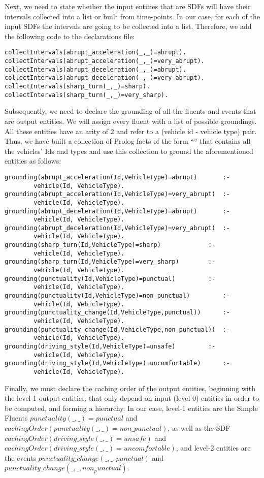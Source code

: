 Next, we need to state whether the input entities that are SDFs will have their intervals collected into a list or built from time-points. In our case, for each of the input SDFs the intervals are going to be collected into a list. Therefore, we add the following code to the declarations file:
%
\begin{verbatim}
collectIntervals(abrupt_acceleration(_,_)=abrupt).
collectIntervals(abrupt_acceleration(_,_)=very_abrupt).
collectIntervals(abrupt_deceleration(_,_)=abrupt).
collectIntervals(abrupt_deceleration(_,_)=very_abrupt).
collectIntervals(sharp_turn(_,_)=sharp).
collectIntervals(sharp_turn(_,_)=very_sharp).
\end{verbatim}
%
Subsequently, we need to declare the grounding of all the fluents and events that are output entities. We will assign every fluent with a list of possible groundings. All these entities have an arity of 2 and refer to a (vehicle id - vehicle type) pair. Thus, we have built a collection of Prolog facts of the form ``'' that contains all the vehicles' Ids and types and use this collection to ground the aforementioned entities as follows: 
%
\begin{verbatim}
grounding(abrupt_acceleration(Id,VehicleType)=abrupt) 		:-
        vehicle(Id, VehicleType). 
grounding(abrupt_acceleration(Id,VehicleType)=very_abrupt) 	:-
        vehicle(Id, VehicleType). 
grounding(abrupt_deceleration(Id,VehicleType)=abrupt) 		:-
        vehicle(Id, VehicleType). 
grounding(abrupt_deceleration(Id,VehicleType)=very_abrupt) 	:-
        vehicle(Id, VehicleType). 
grounding(sharp_turn(Id,VehicleType)=sharp) 			:-
        vehicle(Id, VehicleType). 
grounding(sharp_turn(Id,VehicleType)=very_sharp) 		:-
        vehicle(Id, VehicleType).
grounding(punctuality(Id,VehicleType)=punctual) 		:-
        vehicle(Id, VehicleType).   
grounding(punctuality(Id,VehicleType)=non_punctual) 		:-
        vehicle(Id, VehicleType).
grounding(punctuality_change(Id,VehicleType,punctual)) 		:-
        vehicle(Id, VehicleType).
grounding(punctuality_change(Id,VehicleType,non_punctual)) 	:-
        vehicle(Id, VehicleType).
grounding(driving_style(Id,VehicleType)=unsafe) 		:-
        vehicle(Id, VehicleType).
grounding(driving_style(Id,VehicleType)=uncomfortable) 		:-
        vehicle(Id, VehicleType).
\end{verbatim}
%
Finally, we must declare the caching order of the output entities, beginning with the level-1 output entities, that only depend on input (level-0) entities in order to be computed, and forming a hierarchy. In our case, level-1 entities are the Simple Fluents $\mathit{punctuality(\_,\_)=punctual}$ and $\mathit{cachingOrder(punctuality(\_,\_)=non\_punctual)}$, as well as the SDF $\mathit{cachingOrder(driving\_style(\_,\_)=unsafe)}$ and $\mathit{cachingOrder(driving\_style(\_,\_)=uncomfortable)}$, and level-2 entities are the events $\mathit{punctuality\_change(\_,\_,punctual)}$ and $\mathit{punctuality\_change(\_,\_,non_punctual)}$.
